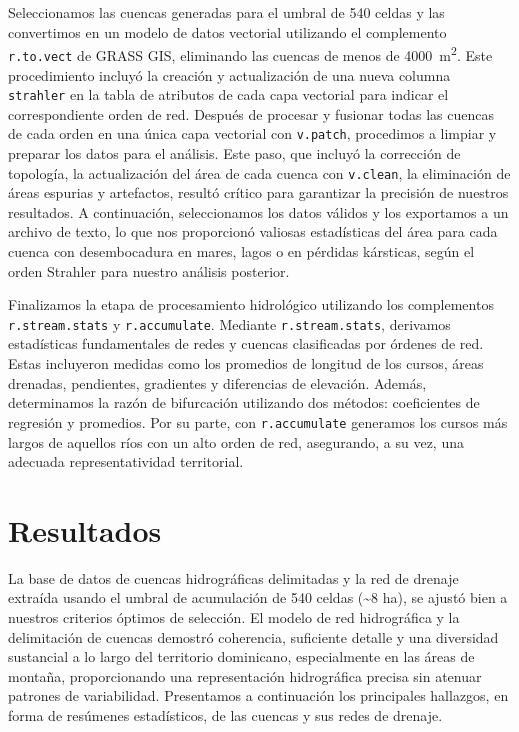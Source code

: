 \documentclass[spanish]{article}
\begin{document}
Seleccionamos las cuencas generadas para el umbral de 540 celdas y las
convertimos en un modelo de datos vectorial utilizando el complemento
\texttt{r.to.vect} de GRASS GIS, eliminando las cuencas de menos de
4000~m\textsuperscript{2}. Este procedimiento incluyó la creación y
actualización de una nueva columna \texttt{strahler} en la tabla de
atributos de cada capa vectorial para indicar el correspondiente orden
de red. Después de procesar y fusionar todas las cuencas de cada orden
en una única capa vectorial con \texttt{v.patch}, procedimos a limpiar y
preparar los datos para el análisis. Este paso, que incluyó la
corrección de topología, la actualización del área de cada cuenca con
\texttt{v.clean}, la eliminación de áreas espurias y artefactos, resultó
crítico para garantizar la precisión de nuestros resultados. A
continuación, seleccionamos los datos válidos y los exportamos a un
archivo de texto, lo que nos proporcionó valiosas estadísticas del área
para cada cuenca con desembocadura en mares, lagos o en pérdidas
kársticas, según el orden Strahler para nuestro análisis posterior.

Finalizamos la etapa de procesamiento hidrológico utilizando los
complementos \texttt{r.stream.stats} y \texttt{r.accumulate}. Mediante
\texttt{r.stream.stats}, derivamos estadísticas fundamentales de redes y
cuencas clasificadas por órdenes de red. Estas incluyeron medidas como
los promedios de longitud de los cursos, áreas drenadas, pendientes,
gradientes y diferencias de elevación. Además, determinamos la razón de
bifurcación utilizando dos métodos: coeficientes de regresión y
promedios. Por su parte, con \texttt{r.accumulate} generamos los cursos
más largos de aquellos ríos con un alto orden de red, asegurando, a su
vez, una adecuada representatividad territorial.

\hypertarget{resultados}{%
\section{Resultados}\label{resultados}}

La base de datos de cuencas hidrográficas delimitadas y la red de
drenaje extraída usando el umbral de acumulación de 540 celdas
(\textasciitilde8 ha), se ajustó bien a nuestros criterios óptimos de
selección. El modelo de red hidrográfica y la delimitación de cuencas
demostró coherencia, suficiente detalle y una diversidad sustancial a lo
largo del territorio dominicano, especialmente en las áreas de montaña,
proporcionando una representación hidrográfica precisa sin atenuar
patrones de variabilidad. Presentamos a continuación los principales
hallazgos, en forma de resúmenes estadísticos, de las cuencas y sus
redes de drenaje.
\end{document}
